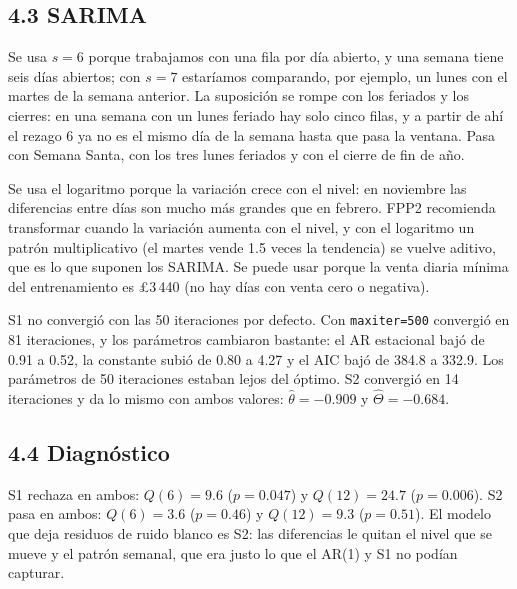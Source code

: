 \documentclass[11pt]{article}
\newcommand{\tabla}[1]{}
\begin{document}
\subsection*{4.3 SARIMA}
Se usa $s=6$ porque trabajamos con una fila por día abierto, y una semana tiene seis días abiertos; con $s=7$ estaríamos comparando, por ejemplo, un lunes con el martes de la semana anterior. La suposición se rompe con los feriados y los cierres: en una semana con un lunes feriado hay solo cinco filas, y a partir de ahí el rezago 6 ya no es el mismo día de la semana hasta que pasa la ventana. Pasa con Semana Santa, con los tres lunes feriados y con el cierre de fin de año.

Se usa el logaritmo porque la variación crece con el nivel: en noviembre las diferencias entre días son mucho más grandes que en febrero. FPP2 recomienda transformar cuando la variación aumenta con el nivel, y con el logaritmo un patrón multiplicativo (el martes vende 1.5 veces la tendencia) se vuelve aditivo, que es lo que suponen los SARIMA. Se puede usar porque la venta diaria mínima del entrenamiento es £3\,440 (no hay días con venta cero o negativa).

\begin{table}[H]\centering\small
\caption{Parámetros de S1 y S2 con el máximo de iteraciones por defecto (50) y con 500.}\label{tab:sarima}
\resizebox{\textwidth}{!}{\tabla{p4_sarima_parametros}}
\end{table}

S1 no convergió con las 50 iteraciones por defecto. Con \texttt{maxiter=500} convergió en 81 iteraciones, y los parámetros cambiaron bastante: el AR estacional bajó de 0.91 a 0.52, la constante subió de 0.80 a 4.27 y el AIC bajó de 384.8 a 332.9. Los parámetros de 50 iteraciones estaban lejos del óptimo. S2 convergió en 14 iteraciones y da lo mismo con ambos valores: $\hat\theta=-0.909$ y $\hat\Theta=-0.684$.

\subsection*{4.4 Diagnóstico}
\begin{table}[H]\centering\small
\caption{Ljung--Box de los residuos de todos los modelos de la Parte 4. Para S1 y S2 se usan $m-2$ grados de libertad; para S2 se descartan los primeros 7 residuos.}
\tabla{p4_ljungbox}
\end{table}

S1 rechaza en ambos: $Q(6)=9.6$ ($p=0.047$) y $Q(12)=24.7$ ($p=0.006$). S2 pasa en ambos: $Q(6)=3.6$ ($p=0.46$) y $Q(12)=9.3$ ($p=0.51$). El modelo que deja residuos de ruido blanco es S2: las diferencias le quitan el nivel que se mueve y el patrón semanal, que era justo lo que el AR(1) y S1 no podían capturar.
\end{document}

